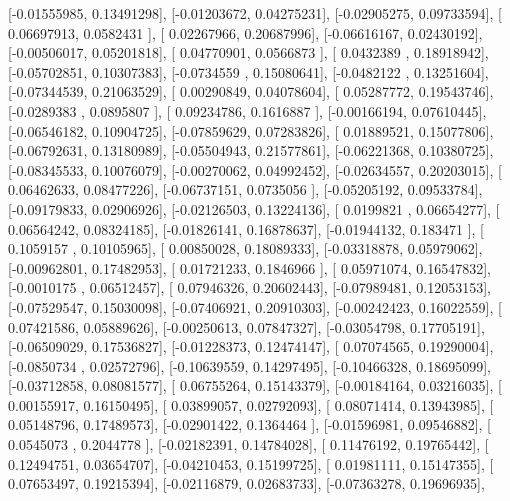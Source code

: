 \documentclass{article}
\begin{document}
       [-0.01555985,  0.13491298],
       [-0.01203672,  0.04275231],
       [-0.02905275,  0.09733594],
       [ 0.06697913,  0.0582431 ],
       [ 0.02267966,  0.20687996],
       [-0.06616167,  0.02430192],
       [-0.00506017,  0.05201818],
       [ 0.04770901,  0.0566873 ],
       [ 0.0432389 ,  0.18918942],
       [-0.05702851,  0.10307383],
       [-0.0734559 ,  0.15080641],
       [-0.0482122 ,  0.13251604],
       [-0.07344539,  0.21063529],
       [ 0.00290849,  0.04078604],
       [ 0.05287772,  0.19543746],
       [-0.0289383 ,  0.0895807 ],
       [ 0.09234786,  0.1616887 ],
       [-0.00166194,  0.07610445],
       [-0.06546182,  0.10904725],
       [-0.07859629,  0.07283826],
       [ 0.01889521,  0.15077806],
       [-0.06792631,  0.13180989],
       [-0.05504943,  0.21577861],
       [-0.06221368,  0.10380725],
       [-0.08345533,  0.10076079],
       [-0.00270062,  0.04992452],
       [-0.02634557,  0.20203015],
       [ 0.06462633,  0.08477226],
       [-0.06737151,  0.0735056 ],
       [-0.05205192,  0.09533784],
       [-0.09179833,  0.02906926],
       [-0.02126503,  0.13224136],
       [ 0.0199821 ,  0.06654277],
       [ 0.06564242,  0.08324185],
       [-0.01826141,  0.16878637],
       [-0.01944132,  0.183471  ],
       [ 0.1059157 ,  0.10105965],
       [ 0.00850028,  0.18089333],
       [-0.03318878,  0.05979062],
       [-0.00962801,  0.17482953],
       [ 0.01721233,  0.1846966 ],
       [ 0.05971074,  0.16547832],
       [-0.0010175 ,  0.06512457],
       [ 0.07946326,  0.20602443],
       [-0.07989481,  0.12053153],
       [-0.07529547,  0.15030098],
       [-0.07406921,  0.20910303],
       [-0.00242423,  0.16022559],
       [ 0.07421586,  0.05889626],
       [-0.00250613,  0.07847327],
       [-0.03054798,  0.17705191],
       [-0.06509029,  0.17536827],
       [-0.01228373,  0.12474147],
       [ 0.07074565,  0.19290004],
       [-0.0850734 ,  0.02572796],
       [-0.10639559,  0.14297495],
       [-0.10466328,  0.18695099],
       [-0.03712858,  0.08081577],
       [ 0.06755264,  0.15143379],
       [-0.00184164,  0.03216035],
       [ 0.00155917,  0.16150495],
       [ 0.03899057,  0.02792093],
       [ 0.08071414,  0.13943985],
       [ 0.05148796,  0.17489573],
       [-0.02901422,  0.1364464 ],
       [-0.01596981,  0.09546882],
       [ 0.0545073 ,  0.2044778 ],
       [-0.02182391,  0.14784028],
       [ 0.11476192,  0.19765442],
       [ 0.12494751,  0.03654707],
       [-0.04210453,  0.15199725],
       [ 0.01981111,  0.15147355],
       [ 0.07653497,  0.19215394],
       [-0.02116879,  0.02683733],
       [-0.07363278,  0.19696935],
\end{document}
